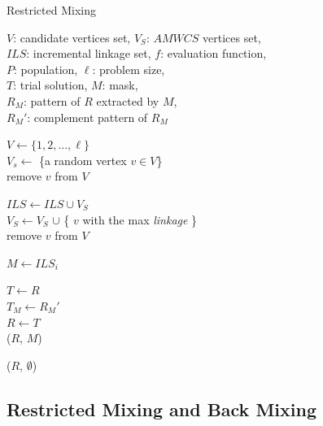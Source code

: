 \documentclass{sig-alternate-05-2015}
\begin{document}
\begin{algorithm}[t!]
\caption{Restricted Mixing}\label{algo_disjdecomp}

$V$: candidate vertices set, $V_S$: $AMWCS$ vertices set,  \\
$ILS$: incremental linkage set, $f$: evaluation function, \\
$P$: population, $\ell$: problem size, \\
$T$: trial solution, $M$: mask, \\
${R_M}$: pattern of $R$ extracted by $M$, \\
${R_M}'$: complement pattern of ${R_M}$


\BlankLine
$V \leftarrow \{ 1, 2, ..., \ell \}$ \\
$V_s \leftarrow$ \{a random vertex $v \in V$\} \\
remove $v$ from $V$ \\

 {

    $ILS \leftarrow ILS \cup V_{S}$ \\
    $V_S \leftarrow V_S$ $\cup$ \{  $v$ with the max {\it linkage} \} \\
    
    remove $v$ from $V$ \\
}

\BlankLine
{} {

    $M \leftarrow ILS_i$ \\

     {

        $T \leftarrow R$ \\
        $T_M \leftarrow {R_M}'$ \\

         {
            $R \leftarrow T$ \\
            \Return ($R$, $M$)
        }
    }
}
\Return ($R$, $\emptyset$) 
\end{algorithm}


\subsection{Restricted Mixing and Back Mixing}
\end{document}
